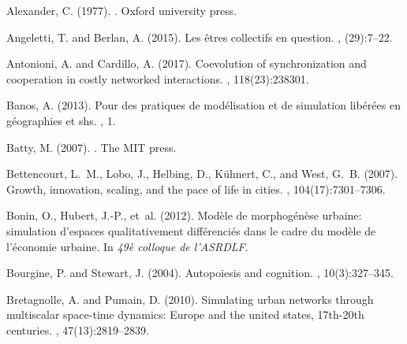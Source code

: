 \documentclass[letterpaper]{article}
\begin{document}
\begin{thebibliography}{}

Alexander, C. (1977).
.
\newblock Oxford university press.

Angeletti, T. and Berlan, A. (2015).
\newblock Les {\^e}tres collectifs en question.
, (29):7--22.

Antonioni, A. and Cardillo, A. (2017).
\newblock Coevolution of synchronization and cooperation in costly networked
  interactions.
, 118(23):238301.

Banos, A. (2013).
\newblock Pour des pratiques de mod{\'e}lisation et de simulation
  lib{\'e}r{\'e}es en g{\'e}ographies et shs.
, 1.

Batty, M. (2007).
.
\newblock The MIT press.

Bettencourt, L.~M., Lobo, J., Helbing, D., K{\"u}hnert, C., and West, G.~B.
  (2007).
\newblock Growth, innovation, scaling, and the pace of life in cities.
,
  104(17):7301--7306.

Bonin, O., Hubert, J.-P., et~al. (2012).
\newblock Mod{\`e}le de morphog{\'e}n{\`e}se urbaine: simulation d'espaces
  qualitativement diff{\'e}renci{\'e}s dans le cadre du mod{\`e}le de
  l'{\'e}conomie urbaine.
\newblock In {\em 49{\`e} colloque de l'ASRDLF}.

Bourgine, P. and Stewart, J. (2004).
\newblock Autopoiesis and cognition.
, 10(3):327--345.

Bretagnolle, A. and Pumain, D. (2010).
\newblock Simulating urban networks through multiscalar space-time dynamics:
  Europe and the united states, 17th-20th centuries.
, 47(13):2819--2839.


\end{thebibliography}
\end{document}
